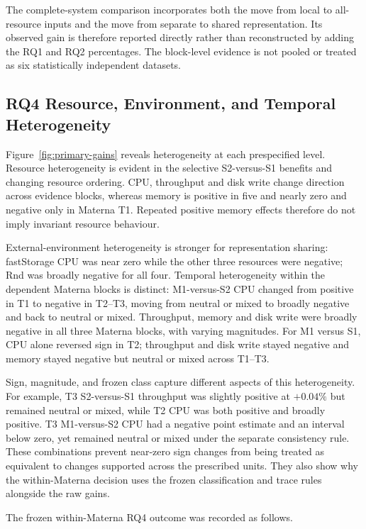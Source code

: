 \documentclass[a4paper,fleqn]{cas-dc}
\begin{document}
The complete-system comparison incorporates both the move from local to
all-resource inputs and the move from separate to shared representation. Its
observed gain is therefore reported directly rather than reconstructed by
adding the RQ1 and RQ2 percentages. The block-level evidence is not pooled or
treated as six statistically independent datasets.

\subsection{RQ4 Resource, Environment, and Temporal Heterogeneity}
\label{sec:results-rq4}

Figure~\ref{fig:primary-gains} reveals heterogeneity at each prespecified
level. Resource heterogeneity is evident in the selective S2-versus-S1
benefits and changing resource ordering. CPU, throughput and disk write change
direction across evidence blocks, whereas memory is positive in five and
nearly zero and negative only in Materna T1. Repeated positive memory effects
therefore do not imply invariant resource behaviour.

External-environment heterogeneity is stronger for representation sharing: fastStorage
CPU was near zero while the other three resources were negative; Rnd was
broadly negative for all four. Temporal heterogeneity within the dependent
Materna blocks is distinct: M1-versus-S2 CPU changed from positive in T1 to
negative in T2--T3, moving from neutral or mixed to broadly negative and back
to neutral or mixed. Throughput, memory and disk write were broadly negative
in all three Materna blocks, with varying magnitudes. For M1 versus S1, CPU
alone reversed sign in T2; throughput and disk write stayed negative and
memory stayed negative but neutral or mixed across T1--T3.

Sign, magnitude, and frozen class capture different aspects of this
heterogeneity. For example, T3 S2-versus-S1 throughput was slightly positive at
$+0.04\%$ but remained neutral or mixed, while T2 CPU was both positive and
broadly positive. T3 M1-versus-S2 CPU had a negative point estimate and an
interval below zero, yet remained neutral or mixed under the separate
consistency rule. These combinations prevent near-zero sign changes from being
treated as equivalent to changes supported across the prescribed units. They
also show why the within-Materna decision uses the frozen classification and
trace rules alongside the raw gains.

The frozen within-Materna RQ4 outcome was recorded as follows.
\end{document}
